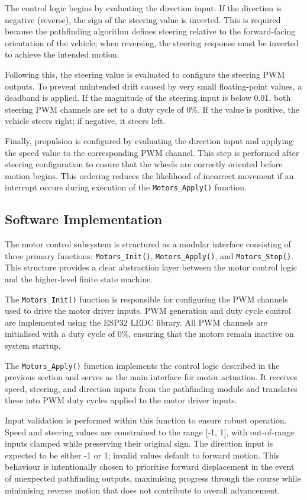 The control logic begins by evaluating the direction input. If the direction is negative (reverse), the sign of the steering value is inverted. This is required because the pathfinding algorithm defines steering relative to the forward-facing orientation of the vehicle; when reversing, the steering response must be inverted to achieve the intended motion.

Following this, the steering value is evaluated to configure the steering PWM outputs. To prevent unintended drift caused by very small floating-point values, a deadband is applied. If the magnitude of the steering input is below 0.01, both steering PWM channels are set to a duty cycle of 0\%. If the value is positive, the vehicle steers right; if negative, it steers left.

Finally, propulsion is configured by evaluating the direction input and applying the speed value to the corresponding PWM channel. This step is performed after steering configuration to ensure that the wheels are correctly oriented before motion begins. This ordering reduces the likelihood of incorrect movement if an interrupt occurs during execution of the \texttt{Motors\_Apply()} function.

\subsection{Software Implementation}

The motor control subsystem is structured as a modular interface consisting of three primary functions: \texttt{Motors\_Init()}, \texttt{Motors\_Apply()}, and \texttt{Motors\_Stop()}. This structure provides a clear abstraction layer between the motor control logic and the higher-level finite state machine.

The \texttt{Motors\_Init()} function is responsible for configuring the PWM channels used to drive the motor driver inputs. PWM generation and duty cycle control are implemented using the ESP32 LEDC library. All PWM channels are initialised with a duty cycle of 0\%, ensuring that the motors remain inactive on system startup.

The \texttt{Motors\_Apply()} function implements the control logic described in the previous section and serves as the main interface for motor actuation. It receives speed, steering, and direction inputs from the pathfinding module and translates these into PWM duty cycles applied to the motor driver inputs.

Input validation is performed within this function to ensure robust operation. Speed and steering values are constrained to the range [-1, 1], with out-of-range inputs clamped while preserving their original sign. The direction input is expected to be either -1 or 1; invalid values default to forward motion. This behaviour is intentionally chosen to prioritise forward displacement in the event of unexpected pathfinding outputs, maximising progress through the course while minimising reverse motion that does not contribute to overall advancement.

